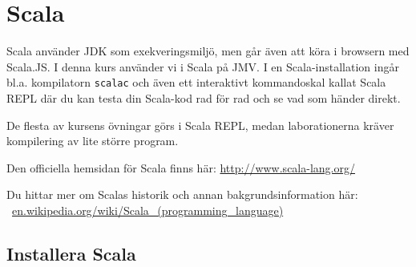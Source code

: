 %
%
%


\section{Scala}

Scala använder JDK som exekveringsmiljö, men går även att köra i browsern med Scala.JS. I denna kurs använder vi i Scala på JMV.
I en Scala-installation ingår bl.a. kompilatorn \texttt{scalac} och även ett interaktivt kommandoskal kallat Scala REPL där du kan testa din Scala-kod rad för rad och se vad som händer direkt.

De flesta av kursens övningar görs i Scala REPL, medan laborationerna kräver kompilering av lite större program.

Den officiella hemsidan för Scala finns här: \url{http://www.scala-lang.org/}

Du hittar mer om Scalas historik och annan bakgrundsinformation här:\\\mbox{%
 \href{https://en.wikipedia.org/wiki/Scala_(programming_language)}{en.wikipedia.org/wiki/Scala\_(programming\_language)}
}

\subsection{Installera Scala}

